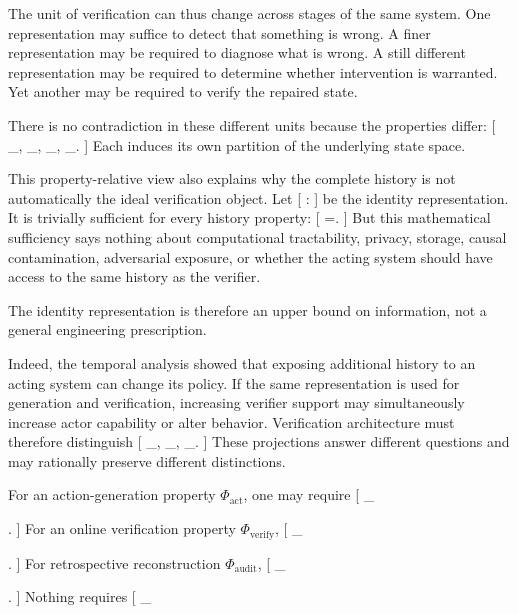 \documentclass[11pt]{article}
\newcommand{\Hist}{\mathcal{H}} \newcommand{\States}{\mathcal{S}} \newcommand{\Actions}{\mathcal{A}} \newcommand{\Obs}{\mathcal{O}} \newcommand{\Img}{\operatorname{Im}}
\begin{document}
The unit of verification can thus change across stages of the same system. One representation may suffice to detect that something is wrong. A finer representation may be required to diagnose what is wrong. A still different representation may be required to determine whether intervention is warranted. Yet another may be required to verify the repaired state.

There is no contradiction in these different units because the properties differ:
[
\Phi_{},
\qquad
\Phi_{},
\qquad
\Phi_{},
\qquad
\Phi_{}.
]
Each induces its own partition of the underlying state space.

This property-relative view also explains why the complete history is not automatically the ideal verification object. Let
[
\operatorname{id}{\Hist}:\Hist\rightarrow\Hist
]
be the identity representation. It is trivially sufficient for every history property:
[
\Phi=\Phi\circ\operatorname{id}{\Hist}.
]
But this mathematical sufficiency says nothing about computational tractability, privacy, storage, causal contamination, adversarial exposure, or whether the acting system should have access to the same history as the verifier.

The identity representation is therefore an upper bound on information, not a general engineering prescription.

Indeed, the temporal analysis showed that exposing additional history to an acting system can change its policy. If the same representation is used for generation and verification, increasing verifier support may simultaneously increase actor capability or alter behavior. Verification architecture must therefore distinguish
[
\pi_{},
\qquad
\pi_{},
\qquad
\pi_{}.
]
These projections answer different questions and may rationally preserve different distinctions.

For an action-generation property $\Phi_{\mathrm{act}}$, one may require
[
\Phi_{}

\circ
{}.
]
For an online verification property $\Phi_{\mathrm{verify}}$,
[
\Phi_{}

\circ
{}.
]
For retrospective reconstruction $\Phi_{\mathrm{audit}}$,
[
\Phi_{}

\circ
{}.
]
Nothing requires
[
\pi_{}
\end{document}
